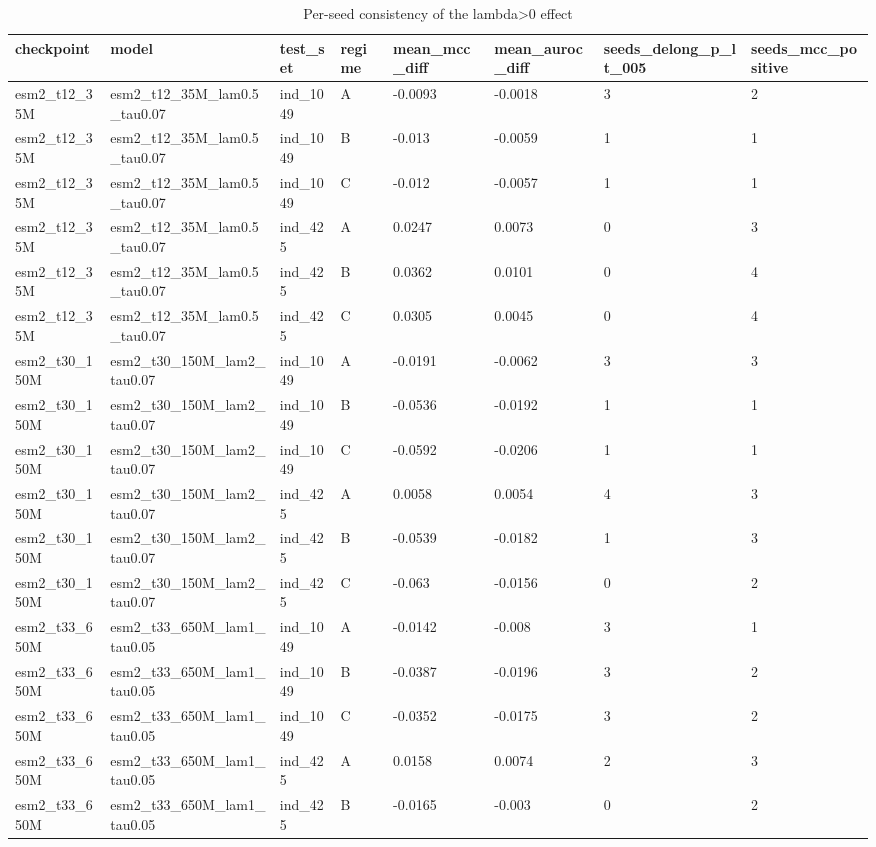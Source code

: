 \begin{table}[ht]
\centering\small
\caption{Per-seed consistency of the lambda>0 effect}
\label{tab:T5_6b_per_seed_consistency}
\begin{tabular}{llllllll}
\hline
checkpoint & model & test\_set & regime & mean\_mcc\_diff & mean\_auroc\_diff & seeds\_delong\_p\_lt\_005 & seeds\_mcc\_positive \\
\hline
esm2\_t12\_35M & esm2\_t12\_35M\_lam0.5\_tau0.07 & ind\_1049 & A & -0.0093 & -0.0018 & 3 & 2 \\
esm2\_t12\_35M & esm2\_t12\_35M\_lam0.5\_tau0.07 & ind\_1049 & B & -0.013 & -0.0059 & 1 & 1 \\
esm2\_t12\_35M & esm2\_t12\_35M\_lam0.5\_tau0.07 & ind\_1049 & C & -0.012 & -0.0057 & 1 & 1 \\
esm2\_t12\_35M & esm2\_t12\_35M\_lam0.5\_tau0.07 & ind\_425 & A & 0.0247 & 0.0073 & 0 & 3 \\
esm2\_t12\_35M & esm2\_t12\_35M\_lam0.5\_tau0.07 & ind\_425 & B & 0.0362 & 0.0101 & 0 & 4 \\
esm2\_t12\_35M & esm2\_t12\_35M\_lam0.5\_tau0.07 & ind\_425 & C & 0.0305 & 0.0045 & 0 & 4 \\
esm2\_t30\_150M & esm2\_t30\_150M\_lam2\_tau0.07 & ind\_1049 & A & -0.0191 & -0.0062 & 3 & 3 \\
esm2\_t30\_150M & esm2\_t30\_150M\_lam2\_tau0.07 & ind\_1049 & B & -0.0536 & -0.0192 & 1 & 1 \\
esm2\_t30\_150M & esm2\_t30\_150M\_lam2\_tau0.07 & ind\_1049 & C & -0.0592 & -0.0206 & 1 & 1 \\
esm2\_t30\_150M & esm2\_t30\_150M\_lam2\_tau0.07 & ind\_425 & A & 0.0058 & 0.0054 & 4 & 3 \\
esm2\_t30\_150M & esm2\_t30\_150M\_lam2\_tau0.07 & ind\_425 & B & -0.0539 & -0.0182 & 1 & 3 \\
esm2\_t30\_150M & esm2\_t30\_150M\_lam2\_tau0.07 & ind\_425 & C & -0.063 & -0.0156 & 0 & 2 \\
esm2\_t33\_650M & esm2\_t33\_650M\_lam1\_tau0.05 & ind\_1049 & A & -0.0142 & -0.008 & 3 & 1 \\
esm2\_t33\_650M & esm2\_t33\_650M\_lam1\_tau0.05 & ind\_1049 & B & -0.0387 & -0.0196 & 3 & 2 \\
esm2\_t33\_650M & esm2\_t33\_650M\_lam1\_tau0.05 & ind\_1049 & C & -0.0352 & -0.0175 & 3 & 2 \\
esm2\_t33\_650M & esm2\_t33\_650M\_lam1\_tau0.05 & ind\_425 & A & 0.0158 & 0.0074 & 2 & 3 \\
esm2\_t33\_650M & esm2\_t33\_650M\_lam1\_tau0.05 & ind\_425 & B & -0.0165 & -0.003 & 0 & 2 \\

\end{tabular}
\end{table}
